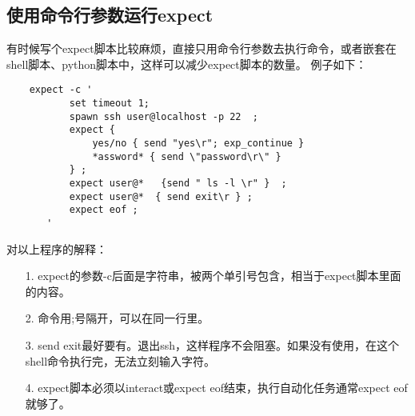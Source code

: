 \documentclass[a4paper,left=2.5cm,right=2.5cm,11pt]{article}
\begin{document}
\subsection{使用命令行参数运行expect}
	有时候写个expect脚本比较麻烦，直接只用命令行参数去执行命令，或者嵌套在shell脚本、python脚本中，这样可以减少expect脚本的数量。
	例子如下：
	\begin{lstlisting}
	expect -c '
           set timeout 1;
           spawn ssh user@localhost -p 22  ;
           expect {
               yes/no { send "yes\r"; exp_continue }
               *assword* { send \"password\r\" }
           } ;
           expect user@*   {send " ls -l \r" }  ;
           expect user@*  { send exit\r } ;
           expect eof ;
       '
	\end{lstlisting}

	对以上程序的解释：
	\begin{itemize}
		\item[1.] expect的参数-c后面是字符串，被两个单引号包含，相当于expect脚本里面的内容。
		\item[2.] 命令用;号隔开，可以在同一行里。
		\item[3.] send exit最好要有。退出ssh，这样程序不会阻塞。如果没有使用，在这个shell命令执行完，无法立刻输入字符。
		\item[4.] expect脚本必须以interact或expect eof结束，执行自动化任务通常expect eof就够了。
	\end{itemize}
\end{document}
